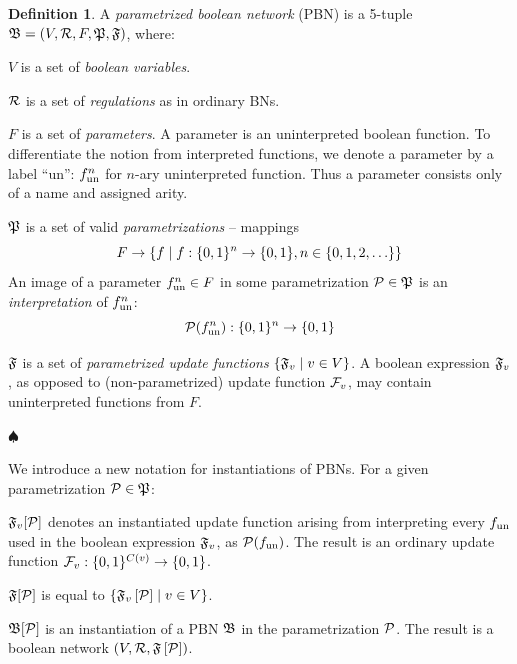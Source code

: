 \documentclass[
	digital, oneside, nosansbold, nocolorbold, nolot, nolof
]{fithesis4}
\theoremstyle{definition}
\newtheorem{definition}{Definition}
\theoremstyle{definition}
\newenvironment{ldefinition}
    {\begin{definition}}
	{\par\hspace{\stretch{1}}$\spadesuit$\hspace{\stretch{1}}
     \par\end{definition}}
\DeclarePairedDelimiter{\set}{\{}{\}}
\begin{document}
\begin{ldefinition}
A \emph{parametrized boolean network} (PBN) is a 5-tuple
$\mathfrak{B} = (V, \mathcal{R}, F, \mathfrak{P}, \mathfrak{F})$, where:
\begin{description}
    \item $V$ is a set of \emph{boolean variables}.
    \item $\mathcal{R}$ is a set of \emph{regulations} as in ordinary BNs.
    \item $F$ is a set of \emph{parameters}. A parameter is an uninterpreted
        boolean function. To differentiate the notion from interpreted
        functions, we denote a parameter by a label \enquote{un}: $f_{\textrm{un}}^{n}$
        for $n$-ary uninterpreted function. Thus a parameter consists only
        of a name and assigned arity.
    \item $\mathfrak{P}$ is a set of valid \emph{parametrizations} -- mappings
        \[
            F \to \set*{ f \mid f : \set{0,1}^n \to \set{0,1},
                n \in \set{0, 1, 2, \ldots} }
        \]
        An image of a parameter $f_{\textrm{un}}^{n} \in F$ in some parametrization
        $\mathcal{P} \in \mathfrak{P}$ is an \emph{interpretation} of
        $f_{\textrm{un}}^{n}$:
        \[
            \paron{P}(\unf{f}^{n}): \set{0, 1}^n \to \set{0, 1}
        \]
    \item $\mathfrak{F}$ is a set of \emph{parametrized update functions} $\set*{
        \PBNUFs{F}_v \mid v \in V }$. A boolean expression $\mathfrak{F}_v$, as
        opposed to (non-parametrized) update function $\mathcal{F}_v$, may
        contain uninterpreted functions from $F$.
\end{description}
\end{ldefinition}

We introduce a new notation for instantiations of PBNs. For a given
parametrization $\mathcal{P} \in \mathfrak{P}$:
\begin{description}
    \item $\mathfrak{F}_v[\mathcal{P}]$ denotes an instantiated
        update function arising from interpreting every $f_{\textrm{un}}$ used in the
        boolean expression $\mathfrak{F}_v$, as $\mathcal{P}(f_{\textrm{un}})$.
        The result is an ordinary update function $\BNUFs{F}_v : \set{0,
        1}^{C(v)} \to \set{0, 1}$.
    \item $\mathfrak{F}[\mathcal{P}]$ is equal to $\set{
        \PBNUFs{F}_v\left[\paron{P}\right] \mid v \in V }$.
    \item $\mathfrak{B}[\mathcal{P}]$ is an instantiation of a PBN
        $\mathfrak{B}$ in the parametrization $\mathcal{P}$. The result is a boolean
        network $\left(V, \mathcal{R}, \mathfrak{F}\left[\mathcal{P}\right]\right)$.
\end{description}
\end{document}
